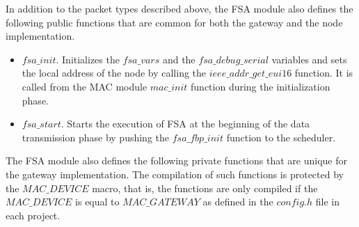 In addition to the packet types described above, the FSA module also defines the following public functions that are common for both the gateway and the node implementation.
\begin{itemize}
\item $fsa\_init$. Initializes the $fsa\_vars$ and the $fsa\_debug\_serial$ variables and sets the local address of the node by calling the $ieee\_addr\_get\_eui16$ function. It is called from the MAC module $mac\_init$ function during the initialization phase.
\item $fsa\_start$. Starts the execution of FSA at the beginning of the data transmission phase by pushing the $fsa\_fbp\_init$ function to the scheduler.
\end{itemize}

The FSA module also defines the following private functions that are unique for the gateway implementation. The compilation of such functions is protected by the $MAC\_DEVICE$ macro, that is, the functions are only compiled if the $MAC\_DEVICE$ is equal to $MAC\_GATEWAY$ as defined in the $config.h$ file in each project.
